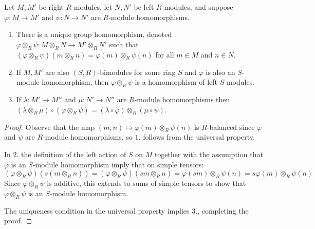\documentclass[12pt, a4paper, oneside, openright, titlepage]{book}
\begin{document}
\begin{thm}
    Let $M,M'$ be right $R$-modules, let $N,N'$ be left $R$-modules, and suppose $\varphi:M\rightarrow M'$ and $\psi:N\rightarrow N'$ are $R$-module homomorphisms.
    \begin{enumerate}
        \item There is a unique group homomorphism, denoted $\varphi\otimes_R\psi:M\otimes_RN\rightarrow M'\otimes_RN'$ such that $(\varphi\otimes_R\psi)(m\otimes_Rn) = \varphi(m)\otimes_R\psi(n)$ for all $m \in M$ and $n \in N$.
        \item If $M,M'$ are also $(S,R)$-bimodules for some ring $S$ and $\varphi$ is also an $S$-module homomorphism, then $\varphi\otimes_R\psi$ is a homomorphism of left $S$-modules. 
        \item If $\lambda:M'\rightarrow M''$ and $\mu:N'\rightarrow N''$ are $R$-module homomorphisms then $(\lambda\otimes_R\mu)\circ(\varphi\otimes_R\psi) = (\lambda\circ \varphi)\otimes_R(\mu\circ\psi)$.
    \end{enumerate}
\end{thm}
\begin{proof}
    Observe that the map $(m,n)\mapsto \varphi(m)\otimes_R\psi(n)$ is $R$-balanced since $\varphi$ and $\psi$ are $R$-module homomorphisms, so $1.$ follows from the universal property.

    In $2.$ the definition of the left action of $S$ on $M$ together with the assumption that $\varphi$ is an $S$-module homomorphism imply that on simple tensors: \begin{equation*}
        (\varphi\otimes_R\psi)(s(m\otimes_Rn)) = (\varphi\otimes_R\psi)(sm\otimes_Rn) = \varphi(sm)\otimes_R\psi(n) = s\varphi(m)\otimes_R\psi(n)
    \end{equation*}
    Since $\varphi\otimes_R\psi$ is additive, this extends to sums of simple tensors to show that $\varphi\otimes_R\psi$ is an $S$-module homomorphism. 

    The uniqueness condition in the universal property implies $3.$, completing the proof.
\end{proof}
\end{document}
